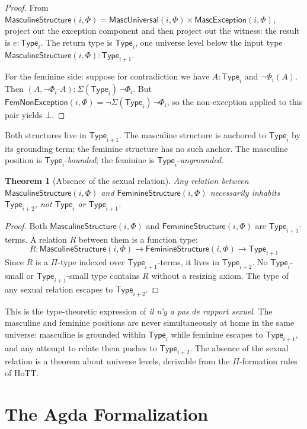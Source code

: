 \documentclass[12pt]{article}
\newtheorem{theorem}{Theorem}
\theoremstyle{definition}
\theoremstyle{remark}
\newcommand{\Type}[1]{\mathsf{Type}_{#1}}
\newcommand{\MascU}{\mathsf{MascUniversal}}
\newcommand{\MascE}{\mathsf{MascException}}
\newcommand{\FemN}{\mathsf{FemNonException}}
\newcommand{\rapport}{\textit{il n'y a pas de rapport sexuel}}
\begin{document}
\begin{proof}
From $\mathsf{MasculineStructure}(i, \Phi) = \MascU(i,\Phi) \times \MascE(i,\Phi)$, project out the exception component and then project out the witness: the result is $e : \Type{i}$. The return type is $\Type{i}$, one universe level below the input type $\mathsf{MasculineStructure}(i, \Phi) : \Type{i+1}$.

For the feminine side: suppose for contradiction we have $A : \Type{i}$ and $\lnot\Phi_i(A)$. Then $(A, \lnot\Phi_i\text{-}A) : \Sigma(\Type{i})\,\lnot\Phi_i$. But $\FemN(i, \Phi) = \lnot\Sigma(\Type{i})\,\lnot\Phi_i$, so the non-exception applied to this pair yields $\bot$.
\end{proof}

Both structures live in $\Type{i+1}$. The masculine structure is anchored to $\Type{i}$ by its grounding term; the feminine structure has no such anchor. The masculine position is $\Type{i}$-\emph{bounded}; the feminine is $\Type{i}$-\emph{ungrounded}.

\begin{theorem}[Absence of the sexual relation]
Any relation between $\mathsf{MasculineStructure}(i, \Phi)$ and $\mathsf{FeminineStructure}(i, \Phi)$ necessarily inhabits $\Type{i+2}$, not $\Type{i}$ or $\Type{i+1}$.
\end{theorem}

\begin{proof}
Both $\mathsf{MasculineStructure}(i, \Phi)$ and $\mathsf{FeminineStructure}(i, \Phi)$ are $\Type{i+1}$-terms. A relation $R$ between them is a function type:
\[
R : \mathsf{MasculineStructure}(i, \Phi) \to \mathsf{FeminineStructure}(i, \Phi) \to \Type{i+1}
\]
Since $R$ is a $\Pi$-type indexed over $\Type{i+1}$-terms, it lives in $\Type{i+2}$. No $\Type{i}$-small or $\Type{i+1}$-small type contains $R$ without a resizing axiom. The type of any sexual relation escapes to $\Type{i+2}$.
\end{proof}

This is the type-theoretic expression of \rapport. The masculine and feminine positions are never simultaneously at home in the same universe: masculine is grounded within $\Type{i}$ while feminine escapes to $\Type{i+1}$, and any attempt to relate them pushes to $\Type{i+2}$. The absence of the sexual relation is a theorem about universe levels, derivable from the $\Pi$-formation rules of HoTT.

\section{The Agda Formalization}
\end{document}
